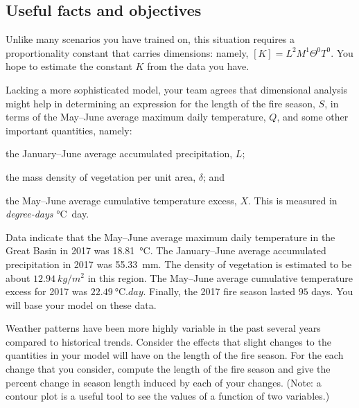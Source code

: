 \documentclass[11pt]{article}\usepackage[]{graphicx}\usepackage[]{color}
\begin{document}
\subsection*{Useful facts and objectives}

    \begin{compactitem}

        \item Unlike many scenarios you have trained on, this situation
        requires a proportionality constant that carries dimensions: namely,
        $[K] = L^{2} M^{1} \Theta^{0} T^{0}$.
        You hope to estimate the constant $K$ from the data you have.

        \item Lacking a more sophisticated model, your team agrees that
        dimensional analysis might help in determining an expression for the
        length of the fire season, $S$, in terms of the May--June average
        maximum daily temperature, $Q$, and some other important quantities,
        namely:
        \begin{compactenum}
            \item the January--June average accumulated precipitation, $L$;
            \item the mass density of vegetation per unit area, $\delta$; and
            \item the May--June average cumulative temperature excess, $X$. This
            is measured in \emph{degree-days} \si{\celsius.day}.
        \end{compactenum}

        \item Data indicate that the May--June average maximum daily temperature in
        the Great Basin in 2017 was
        \SI{18.81}{\celsius}. The January--June average
        accumulated precipitation in 2017 was
        \SI{55.33}{mm}. The density of vegetation is
        estimated to be about $\SI{12.94}{kg/m^2}$ in this region.
        The May--June average cumulative temperature excess for 2017 was
        $\SI{22.49}{\celsius.day}$. Finally, the 2017 fire season
        lasted $\num{95}$ days. You will base your model on these
        data.

        \item Weather patterns have been more highly variable in the past several years
        compared to historical trends. Consider the effects that slight changes to the
        quantities in your model will have on the length of the fire season. For the
        each change that you consider, compute the length of the fire season and give the
        percent change in season length induced by each of your changes. (Note: a contour
        plot is a useful tool to see the values of a function of two variables.)

    \end{compactitem}
\end{document}
